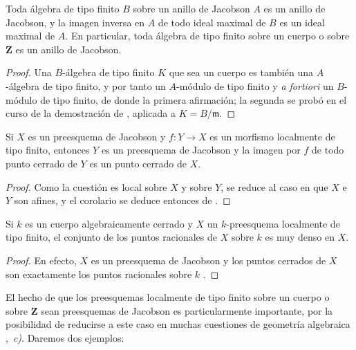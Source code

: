\begin{corollary}[10.4.6]
\label{IV.10.4.6}
Toda álgebra de tipo finito $B$ sobre un anillo de Jacobson $A$ es un anillo de Jacobson, y la imagen inversa en $A$ de todo ideal maximal de $B$ es un ideal maximal de $A$.
En particular, toda álgebra de tipo finito sobre un cuerpo o sobre $\mathbf Z$ es un anillo de Jacobson.
\end{corollary}

\begin{proof}
Una $B$-álgebra de tipo finito $K$ que sea un cuerpo es también una $A$-álgebra de tipo finito, y por tanto un $A$-módulo de tipo finito y \emph{a fortiori} un $B$-módulo de tipo finito, de donde la primera afirmación; la segunda se probó en el curso de la demostración de , aplicada a $K=B/\mathfrak m$.
\end{proof}

\begin{corollary}[10.4.7]
\label{IV.10.4.7}
Si $X$ es un preesquema de Jacobson y $f:Y\to X$ es un morfismo localmente de tipo finito, entonces $Y$ es un preesquema de Jacobson y la imagen por $f$ de todo punto cerrado de $Y$ es un punto cerrado de $X$.
\end{corollary}

\begin{proof}
Como la cuestión es local sobre $X$ y sobre $Y$, se reduce al caso en que $X$ e $Y$ son afines, y el corolario se deduce entonces de .
\end{proof}

\begin{corollary}[10.4.8]
\label{IV.10.4.8}
Si $k$ es un cuerpo algebraicamente cerrado y $X$ un $k$-preesquema localmente de tipo finito, el conjunto de los puntos racionales de $X$ sobre $k$ es muy denso en $X$.
\end{corollary}

\begin{proof}
En efecto, $X$ es un preesquema de Jacobson  y los puntos cerrados de $X$ son exactamente los puntos racionales sobre $k$ .
\end{proof}

\begin{env}[10.4.9]
\label{IV.10.4.9}
El hecho de que los preesquemas localmente de tipo finito sobre un cuerpo o sobre $\mathbf Z$ sean preesquemas de Jacobson es particularmente importante, por la posibilidad de reducirse a este caso en muchas cuestiones de geometría algebraica ,~\emph{c)}.
Daremos dos ejemplos:
\end{env}

